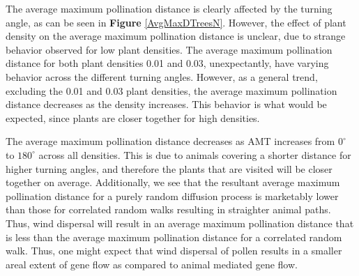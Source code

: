 \documentclass[preprint,12pt]{elsarticle}
\numberwithin{equation}{subsection}
\begin{document}
The average maximum pollination distance is clearly affected by the turning
angle, as can be seen in {\bf Figure} \ref{AvgMaxDTreesN}. However, the effect
of plant density on the average maximum pollination distance is unclear, due to
strange behavior observed for low plant densities. The average maximum
pollination distance for both plant densities 0.01 and 0.03, unexpectantly, have
varying behavior across the different turning angles. However, as a general
trend, excluding the 0.01 and 0.03 plant densities, the average maximum
pollination distance decreases as the density increases. This behavior is what
would be expected, since plants are closer together for high densities.

The average maximum pollination distance decreases as AMT increases from
$0^{\circ}$ to $180^{\circ}$ across all densities. This is due to animals
covering a shorter distance for higher turning angles, and therefore the plants
that are visited will be closer together on average. Additionally, we see that
the resultant average maximum pollination distance for a purely random diffusion
process is marketably lower than those for correlated random walks resulting in
straighter animal paths. Thus, wind dispersal will result in an average maximum
pollination distance that is less than the average maximum pollination distance
for a correlated random walk. Thus, one might expect that wind dispersal of
pollen results in a smaller areal extent of gene flow as compared to animal
mediated gene flow.
\end{document}
